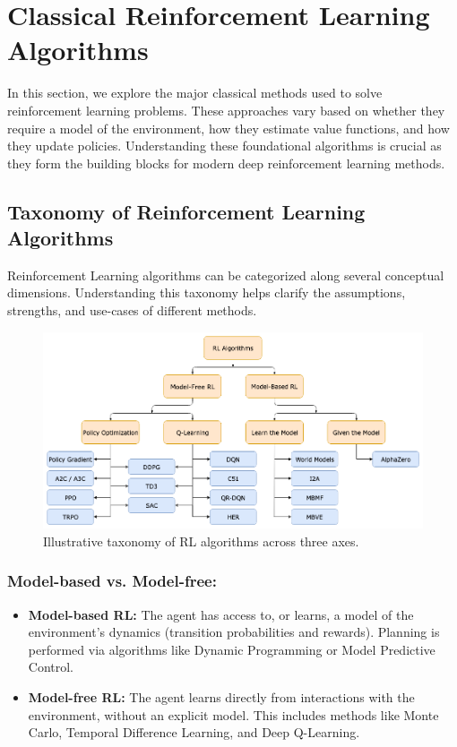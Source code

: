\documentclass[../Main.tex]{subfiles}
\begin{document}
\section{Classical Reinforcement Learning Algorithms}

In this section, we explore the major classical methods used to solve reinforcement learning problems. These approaches vary based on whether they require a model of the environment, how they estimate value functions, and how they update policies. Understanding these foundational algorithms is crucial as they form the building blocks for modern deep reinforcement learning methods.

\subsection{Taxonomy of Reinforcement Learning Algorithms}

Reinforcement Learning algorithms can be categorized along several conceptual dimensions. Understanding this taxonomy helps clarify the assumptions, strengths, and use-cases of different methods.

\begin{figure}[h]
    \centering
    \includegraphics[width=1\textwidth]{img/RL-taxonomy.png}
    \caption{Illustrative taxonomy of RL algorithms across three axes.}
\end{figure}

\subsubsection{Model-based vs. Model-free:}
\begin{itemize}
    \item \textbf{Model-based RL:} The agent has access to, or learns, a model of the environment's dynamics (transition probabilities and rewards). Planning is performed via algorithms like Dynamic Programming or Model Predictive Control.
    \item \textbf{Model-free RL:} The agent learns directly from interactions with the environment, without an explicit model. This includes methods like Monte Carlo, Temporal Difference Learning, and Deep Q-Learning.
\end{itemize}
\end{document}
